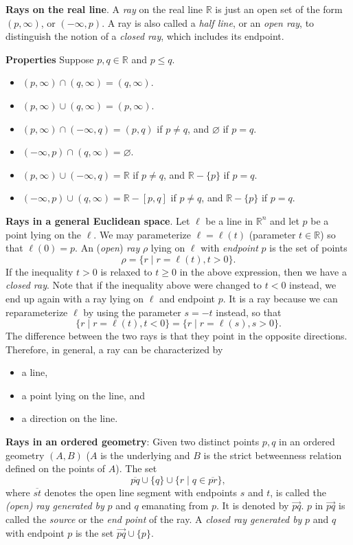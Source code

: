 \documentclass[12pt]{article}
\newcommand{\ray}[1]{\overrightarrow{#1}}
\begin{document}

\textbf{Rays on the real line}.  A \emph{ray} on the real line $\mathbb{R}$ is just an open set of the form $(p,\infty)$, or $(-\infty,p)$.  A ray is also called a \emph{half line}, or an \emph{open ray}, to distinguish the notion of a \emph{closed ray}, which includes its endpoint.

\textbf{Properties}  Suppose $p,q\in\mathbb{R}$ and $p\le q$.
\begin{itemize}
\item $(p,\infty)\cap(q,\infty)=(q,\infty)$.
\item $(p,\infty)\cup(q,\infty)=(p,\infty)$.
\item $(p,\infty)\cap(-\infty,q)=(p,q)$ if $p\ne q$, and $\varnothing$ if $p=q$.
\item $(-\infty,p)\cap(q,\infty)=\varnothing$.
\item $(p,\infty)\cup(-\infty,q)=\mathbb{R}$ if $p\ne q$, and $\mathbb{R}-\lbrace p\rbrace$ if $p=q$.
\item $(-\infty,p)\cup(q,\infty)=\mathbb{R}-[p,q]$ if $p\ne q$, and $\mathbb{R}-\lbrace p\rbrace$ if $p=q$.
\end{itemize}
\textbf{Rays in a general Euclidean space}.  Let $\ell$ be a line in $\mathbb{R}^n$ and let $p$ be a point lying on the $\ell$.  We may parameterize $\ell=\ell(t)$ (parameter $t\in \mathbb{R}$) so that $\ell(0)=p$. An (\emph{open}) \emph{ray} $\rho$ lying on $\ell$ with \emph{endpoint} $p$ is the set of points 
$$\rho=\lbrace r\mid r=\ell(t), t>0 \rbrace.$$
If the inequality $t>0$ is relaxed to $t\ge 0$ in the above expression, then we have a \emph{closed ray}.  Note that if the inequality above were changed to $t<0$ instead, we end up again with a ray lying on $\ell$ and endpoint $p$.  It is a ray because we can reparameterize $\ell$ by using the parameter $s=-t$ instead, so that 
$$\lbrace r\mid r=\ell(t), t<0\rbrace = \lbrace r \mid r=\ell(s),s>0\rbrace.$$ 
The difference between the two rays is that they point in the opposite directions.  Therefore, in general, a ray can be
characterized by 
\begin{itemize}
\item a line,
\item a point lying on the line, and
\item a direction on the line.
\end{itemize}
\textbf{Rays in an ordered geometry}: Given two distinct points
$p,q$ in an ordered geometry $(A,B)$ ($A$ is the underlying  and $B$ is the strict betweenness relation defined on the points of $A$).  The set 
$$\overline{pq}\cup\lbrace q\rbrace\cup\lbrace r\mid q\in\overline{pr} \rbrace,$$ 
where $\overline{st}$ denotes the open line segment with endpoints $s$ and $t$, is called the \emph{(open) ray generated by} $p$ and $q$ emanating from $p$. It is denoted by $\ray{pq}$. $p$ in $\ray{pq}$ is called the \emph{source} or the
\emph{end point} of the ray.  A \emph{closed ray generated by} $p$ and $q$ with endpoint $p$ is the set $\ray{pq}\cup\lbrace p\rbrace$.
\end{document}
